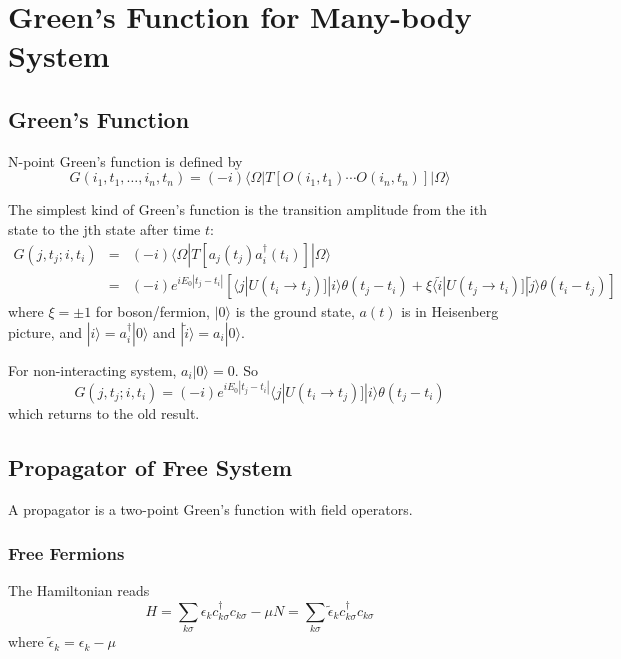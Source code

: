 \documentclass[12pt]{book}
\begin{document}
\chapter{Green's Function for Many-body System}

\section{Green's Function}
	N-point Green's function is defined by
	\begin{equation}
		G(i_1,t_1,\dots,i_n,t_n)=(-i)\langle \Omega|T[O(i_1,t_1)\cdots O(i_n,t_n)]|\Omega\rangle
	\end{equation}

	The simplest kind of Green's function is the transition amplitude from the ith state to the jth state after time $t$:
	\begin{eqnarray}
		G(j,t_j;i,t_i)&=&(-i)\langle \Omega|T[a_{j}(t_j)a^\dagger_{i}(t_i)]|\Omega\rangle\\
		&=&(-i)e^{iE_0|t_j-t_i|}[\langle j|U(t_i\rightarrow t_j)]|i\rangle\theta(t_j-t_i)+\xi\langle \tilde i|U(t_j\rightarrow t_i)]|\tilde j\rangle\theta(t_i-t_j)]
	\end{eqnarray}
	where $\xi=\pm 1$ for boson/fermion, $|0\rangle$ is the ground state, $a(t)$ is in Heisenberg picture, and $|i\rangle=a^\dagger_i|0\rangle$ and $|\tilde i\rangle=a_i|0\rangle$.
	
	For non-interacting system, $a_i|0\rangle=0$. So
	\begin{equation}
		G(j,t_j;i,t_i)=(-i)e^{iE_0|t_j-t_i|}\langle j|U(t_i\rightarrow t_j)]|i\rangle\theta(t_j-t_i)
	\end{equation}
	which returns to the old result.
	
\section{Propagator of Free System}

	A propagator is a two-point Green's function with field operators.
	\subsection{Free Fermions}
	The Hamiltonian reads
	\begin{equation}
		H=\sum_{k\sigma}\epsilon_k c_{k\sigma}^\dagger c_{k\sigma}-\mu N=\sum_{k\sigma}\tilde\epsilon_k c_{k\sigma}^\dagger c_{k\sigma}
	\end{equation}
	where $\tilde\epsilon_k=\epsilon_k-\mu$
	
\end{document}

